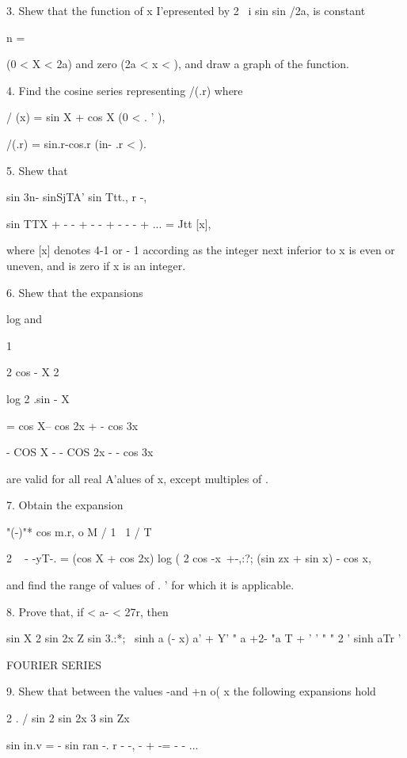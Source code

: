 {3. Shew that the function of x I'epresented by 2 ~i sin sin /2a, is
constant

n = \

(0 < X < 2a) and zero (2a < x < \pi), and draw a graph of the function.


4. Find the cosine series representing /(.r) where

/ (x) = sin X + cos X (0 < . ' \pi ),

/(.r) = sin.r-cos.r (in- .r < \pi). 

5. Shew that

sin 3n- sinSjTA' sin Ttt., r -,

sin TTX + - - + - - + - - - + ... = Jtt [x],

where [x] denotes 4-1 or - 1 according as the integer next inferior to
x is even or uneven, and is zero if x is an integer. 

6. Shew that the expansions

log and

1

2 cos - X 2

log 2 .sin - X

= cos X-- cos 2x + - cos 3x

- COS X - - COS 2x - - cos 3x

are valid for all real A'alues of x, except multiples of \pi.

7. Obtain the expansion

"(-)"* cos m.r, o M / 1 \ 1 /  T  \

2 ~ - -yT-. = (cos X + cos 2x) log ( 2 cos -x\ +-,:?; (sin zx + sin x)
- cos x,

and find the range of values of . ' for which it is applicable.

8. Prove that, if < a- < 27r, then

sin X 2 sin 2x Z sin 3.:*; \ \pi sinh a (\pi - x) a' + Y' " a +2- "a T +
' ' " " 2 ' sinh aTr '


FOURIER SERIES

%
%

9. Shew that between the values -\pi and +n o( x the following
expansions hold

2 . / sin 2 sin 2x 3 sin Zx

sin in.v = - sin ran -. r - -, - + -= - - ...

}
